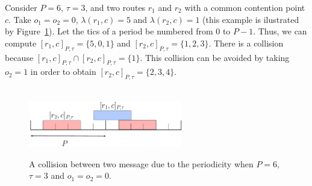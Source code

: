 \documentclass[a4paper,10pt]{journal}
\begin{document}
\begin{examplee}
Consider $P=6$, $\tau = 3$, and two routes $r_1$ and $r_2$ with a common contention point $c$. Take $o_1 = o_2 = 0$, $\lambda(r_1,c) = 5$ and $\lambda(r_2,c) = 1$ (this example is ilustrated by Figure~\ref{fig:cols}). Let the tics of a period be numbered from $0$ to $P-1$. Thus, we can compute $[r_1,c]_{P,\tau} =\{5,0,1\}$ and $[r_2,c]_{P,\tau} = \{1,2,3\}$. There is a collision because $[r_1,c]_{P,\tau}\cap[r_2,c]_{P,\tau}=\{1\} $. This collision can be avoided by taking $o_2=1$ in order to obtain $[r_2,c]_{P,\tau} = \{2,3,4\} $.
\end{examplee}
\begin{figure}
 
 \begin{center}
\\

\vspace{0.5cm}
\includegraphics[width=0.6\textwidth]{cols}
\caption{A collision between two message due to the periodicity when $P=6$,$\tau=3$ and $o_1 = o_2 = 0$.}
\label{fig:cols}
\end{center}

\end{figure}
\end{document}
